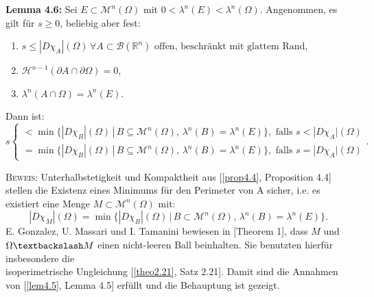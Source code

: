 \colorbox{generalYellow}{\begin{minipage}{16cm}{\textcolor{black}{}{\label{lem4.6}}}
\textbf{Lemma 4.6:} Sei \(E \subset \mathcal{M}^n(\Omega)\) mit \(0 < \lambda^n(E) < \lambda^n(\Omega)\). Angenommen, es gilt für \(s \geq 0\), beliebig aber fest:
\begin{enumerate}
    \item \(s \leq |D\chi_A|(\Omega) \, \forall A \subset \mathcal{B}(\mathbb{R}^n) \text{ offen, beschränkt mit glattem Rand}\),
    \item \(\mathcal{H}^{n-1}(\partial A \cap \partial \Omega) = 0\),
    \item \(\lambda^n(A \cap \Omega) = \lambda^n(E)\).
\end{enumerate}
Dann ist:
\begin{equation}
    s \begin{cases}
        < \min \{|D\chi_B|(\Omega) \, | \, B \subseteq \mathcal{M}^n(\Omega), \, \lambda^n(B) = \lambda^n(E)\}, \text{ falls }s < |D\chi_A|(\Omega) \\
        = \min \{|D\chi_B|(\Omega) \, | \, B \subseteq \mathcal{M}^n(\Omega), \, \lambda^n(B) = \lambda^n(E)\}, \text{ falls }s = |D\chi_A|(\Omega)
    \end{cases}.
\end{equation}
\end{minipage}}

\textsc{Beweis:} Unterhalbstetigkeit und Kompaktheit aus [\ref{prop4.4}, Proposition 4.4] stellen die Existenz eines Minimums für den Perimeter von A sicher, i.e. es existiert eine Menge \(M \subset \mathcal{M}^n(\Omega)\) mit:
\begin{equation}
    |D\chi_M|(\Omega) = \min \{|D\chi_B|(\Omega) \, | \, B \subset \mathcal{M}^n(\Omega), \, \lambda^n(B) = \lambda^n(E)\}.
\end{equation}
E. Gonzalez, U. Massari und I. Tamanini bewiesen in \cite{gonzalez1983regularity}[Theorem 1], dass \(M\) und \(\Omega \textbackslash M\) einen nicht-leeren Ball beinhalten. Sie benutzten hierfür insbesondere die \\isoperimetrische Ungleichung [\ref{theo2.21}, Satz 2.21]. Damit sind die Annahmen von [\ref{lem4.5}, Lemma 4.5] erfüllt und die Behauptung ist gezeigt. \QEDB

